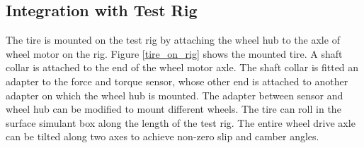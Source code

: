 \documentclass{article}
\begin{document}
\subsection{Integration with Test Rig}

The tire is mounted on the test rig by attaching the wheel hub to the axle of wheel motor on the rig. Figure \ref{tire_on_rig} shows the mounted tire. A shaft collar is attached to the end of the wheel motor axle. The shaft collar is fitted an adapter to the force and torque sensor, whose other end is attached to another adapter on which the wheel hub is mounted. The adapter between sensor and wheel hub can be modified to mount different wheels. The tire can roll in the surface simulant box along the length of the test rig. The entire wheel drive axle can be tilted along two axes to achieve non-zero slip and camber angles. 
\end{document}
